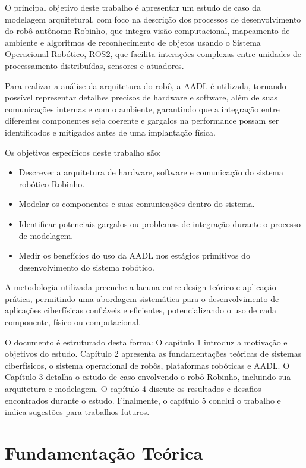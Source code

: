 \documentclass[
    12pt, 
    a4paper, 
    chapter=TITLE,		%
    section=TITLE,		%
    oneside,            %
    english
]{abntex2}
\begin{document}
O principal objetivo deste trabalho é apresentar um estudo de caso da modelagem arquitetural, com foco na descrição dos processos de desenvolvimento do robô autônomo Robinho, que integra visão computacional, mapeamento de ambiente e algoritmos de reconhecimento de objetos usando o Sistema Operacional Robótico, ROS2, que facilita interações complexas entre unidades de processamento distribuídas, sensores e atuadores.

Para realizar a análise da arquitetura do robô, a AADL é utilizada, tornando possível representar detalhes precisos de hardware e software, além de suas comunicações internas e com o ambiente, garantindo que a integração entre diferentes componentes seja coerente e gargalos na performance possam ser identificados e mitigados antes de uma implantação física.

Os objetivos específicos deste trabalho são:
\begin{itemize}
    \item Descrever a arquitetura de hardware, software e comunicação do sistema robótico Robinho.
    \item Modelar os componentes e suas comunicações dentro do sistema.
    \item Identificar potenciais gargalos ou problemas de integração durante o processo de modelagem.
    \item Medir os benefícios do uso da AADL nos estágios primitivos do desenvolvimento do sistema robótico.
\end{itemize}

A metodologia utilizada preenche a lacuna entre design teórico e aplicação prática, permitindo uma abordagem sistemática para o desenvolvimento de aplicações ciberfísicas confiáveis e eficientes, potencializando o uso de cada componente, físico ou computacional.

O documento é estruturado desta forma: O capítulo 1 introduz a motivação e objetivos do estudo. Capítulo 2 apresenta as fundamentações teóricas de sistemas ciberfísicos, o sistema operacional de robôs, plataformas robóticas e AADL. O Capítulo 3 detalha o estudo de caso envolvendo o robô Robinho, incluindo sua arquitetura e modelagem. O capítulo 4 discute os resultados e desafios encontrados durante o estudo. Finalmente, o capítulo 5 conclui o trabalho e indica sugestões para trabalhos futuros.

\chapter{Fundamentação Teórica}
\end{document}
